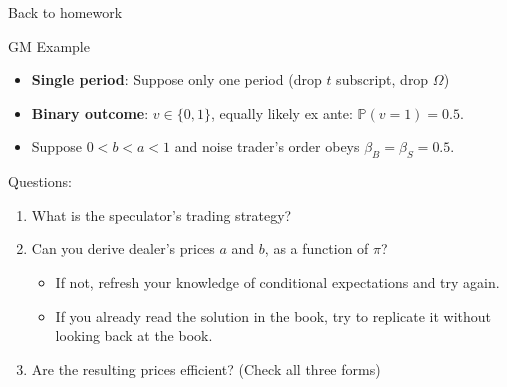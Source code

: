 \documentclass[english,10pt
,aspectratio=169
]{beamer}
\begin{document}
\begin{frame}{Back to homework}
	\begin{exampleblock}{GM Example}
		\begin{itemize}
			\item \textbf{Single period}: Suppose only one period (drop $t$ subscript, drop $\Omega$)
			\item \textbf{Binary outcome}: $v \in \{ 0, 1\}$, equally likely ex ante: $\mathbb{P}(v=1) = 0.5$.
			\item Suppose $0 < b < a < 1$ and noise trader's order obeys $\beta_B=\beta_S=0.5$. 
		\end{itemize}
		Questions:
		\begin{enumerate}
			\item What is the speculator's trading strategy?
			\item Can you derive dealer's \alert{prices $a$ and $b$}, as a function of $\pi$?
			\begin{itemize}
				\item If not, refresh your knowledge of conditional expectations and try again.
				\item If you already read the solution in the book, try to replicate it without looking back at the book.
			\end{itemize}
			\item Are the resulting prices efficient? (Check all three forms)
		\end{enumerate}
	\end{exampleblock}
\end{frame}
\end{document}
